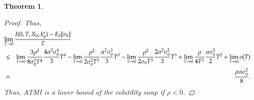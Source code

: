 \documentclass[11pt]{article}
\newtheorem{theorem}{Theorem}
\begin{document}
\begin{theorem}
\begin{proof}
Thus,
\begin{eqnarray}
\lefteqn{\lim_{T\rightarrow 0}\frac{I( 0,T,X_0,k_0^*) -E_{0}[v_{0}]} {T}}\nonumber \\
&\le& 
\lim_{T\rightarrow 0}\frac{3\rho^{2}}{8\sigma _{0}^{3}T^{4}} \frac{4 \alpha^2 \sigma_0^4}{3}T^4
- \lim_{T\rightarrow 0}\frac{\rho ^{2}}{{2\sigma _{0}^2T^{3}}}\frac{\alpha^2 \sigma_0^3}{3}T^3
- \lim_{T\rightarrow 0}\frac{\rho ^{2}}{2\sigma _{0}T^{3}} \frac{2 \alpha^2\sigma_0^2}{3}T^3
+ \lim_{T\rightarrow 0}\frac{\rho}{4T^{2}} \frac{\alpha \sigma_0^2}{2}T^2 + \lim_{T\to 0}o(T)\nonumber\\
&=& \frac{\rho \alpha \sigma_0^2}{8}.
\end{eqnarray}
Thus, ATMI is a lower bound of the volatility swap if $\rho<0$.
\end{proof}
\end{theorem}
\end{document}
